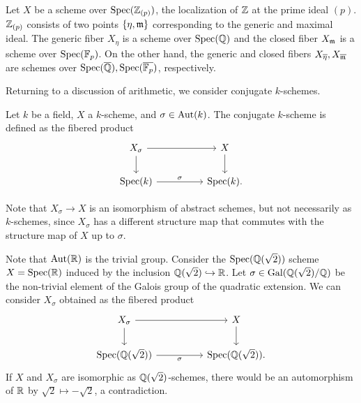 \begin{example}
    Let $X$ be a scheme over $\operatorname{Spec}(\mathbb{Z}_{(p)})$, the localization of $\mathbb{Z}$ at the prime ideal $(p)$. $\mathbb{Z}_{(p)}$ consists of two points $\{\eta,\mathfrak{m}\}$ corresponding to the generic and maximal ideal. The generic fiber $X_{\eta}$ is a scheme over $\operatorname{Spec}(\mathbb{Q})$ and the closed fiber $X_{\mathfrak{m}}$ is a scheme over $\operatorname{Spec}(\mathbb{F}_{p})$. On the other hand, the generic and closed fibers $X_{\overline{\eta}},X_{\overline{\mathfrak{m}}}$ are schemes over $\operatorname{Spec}(\overline{\mathbb{Q}}),\operatorname{Spec}(\overline{\mathbb{F}_{p}})$, respectively. 
\end{example}
Returning to a discussion of arithmetic, we consider conjugate $k$-schemes. 
\begin{definition}\label{def: conjugate k-schemes}
    Let $k$ be a field, $X$ a $k$-scheme, and $\sigma\in\mathrm{Aut}(k)$. The conjugate $k$-scheme is defined as the fibered product 
    $$%
    \begin{tikzcd}
        {X_{\sigma}} && X \\
        {\spec(k)} && {\spec(k).}
        \arrow[from=1-1, to=1-3]
        \arrow[from=1-1, to=2-1]
        \arrow[from=1-3, to=2-3]
        \arrow["\sigma", from=2-1, to=2-3]
    \end{tikzcd}$$
\end{definition}
Note that $X_{\sigma}\to X$ is an isomorphism of abstract schemes, but not necessarily as $k$-schemes, since $X_{\sigma}$ has a different structure map that commutes with the structure map of $X$ up to $\sigma$. 
\begin{example}\label{ex: non-isomorphic as schemes over the base}
    Note that $\mathrm{Aut}(\mathbb{R})$ is the trivial group. Consider the $\operatorname{Spec}(\mathbb{Q}(\sqrt{2}))$ scheme $X=\operatorname{Spec}(\mathbb{R})$ induced by the inclusion $\mathbb{Q}(\sqrt{2})\hookrightarrow\mathbb{R}$. Let $\sigma\in\mathrm{Gal}(\mathbb{Q}(\sqrt{2})/\mathbb{Q})$ be the non-trivial element of the Galois group of the quadratic extension. We can consider $X_{\sigma}$ obtained as the fibered product 
    $$%
    \begin{tikzcd}
        {X_{\sigma}} && X \\
        {\spec(\QQ(\sqrt{2}))} && {\spec(\QQ(\sqrt{2})).}
        \arrow[from=1-1, to=1-3]
        \arrow[from=1-1, to=2-1]
        \arrow[from=1-3, to=2-3]
        \arrow["\sigma"', from=2-1, to=2-3]
    \end{tikzcd}$$
    If $X$ and $X_{\sigma}$ are isomorphic as $\mathbb{Q}(\sqrt{2})$-schemes, there would be an automorphism of $\mathbb{R}$ by $\sqrt{2}\mapsto-\sqrt{2}$, a contradiction. 
\end{example}